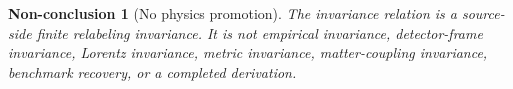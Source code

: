 \documentclass[11pt]{article}
\newtheorem{nonconclusion}{Non-conclusion}
\begin{document}
\begin{nonconclusion}[No physics promotion]
The invariance relation is a source-side finite relabeling invariance. It is
not empirical invariance, detector-frame invariance, Lorentz invariance,
metric invariance, matter-coupling invariance, benchmark recovery, or a
completed derivation.
\end{nonconclusion}
\end{document}
